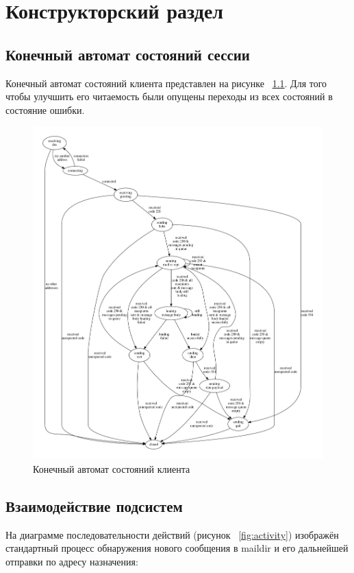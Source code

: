 \documentclass[a4paper,12pt]{report}
\begin{document}
\chapter{Конструкторский раздел}

\section{Конечный автомат состояний сессии}

Конечный автомат состояний клиента представлен на рисунке ~\ref{fig:fsm}. Для
того чтобы улучшить его читаемость были опущены переходы из всех состояний в
состояние ошибки.

\begin{figure}
\centering
\includegraphics[width=\textwidth]{.tmp/report/fsm.pdf}
\caption{Конечный автомат состояний клиента}
\label{fig:fsm}
\end{figure}

\section{Взаимодействие подсистем}

На диаграмме последовательности действий (рисунок ~\ref{fig:activity})
изображён стандартный процесс обнаружения нового сообщения в maildir и его
дальнейшей отправки по адресу назначения:
\end{document}
